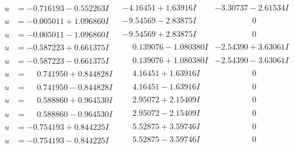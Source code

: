 \documentclass[1p]{elsarticle_modified}
\theoremstyle{definition}
\begin{document}
$$\begin{array}{c|c|c}
\begin{aligned}
u &= -0.716193 - 0.552263 I\end{aligned}
 & -4.16451 + 1.63916 I & -3.30737 - 2.61534 I \\ \hline\begin{aligned}
u &= -0.005011 + 1.096860 I\end{aligned}
 & -9.54569 - 2.83875 I & \phantom{-0.000000 } 0 \\ \hline\begin{aligned}
u &= -0.005011 - 1.096860 I\end{aligned}
 & -9.54569 + 2.83875 I & \phantom{-0.000000 } 0 \\ \hline\begin{aligned}
u &= -0.587223 + 0.661375 I\end{aligned}
 & \phantom{-}0.139076 - 1.080380 I & -2.54390 + 3.63061 I \\ \hline\begin{aligned}
u &= -0.587223 - 0.661375 I\end{aligned}
 & \phantom{-}0.139076 + 1.080380 I & -2.54390 - 3.63061 I \\ \hline\begin{aligned}
u &= \phantom{-}0.741950 + 0.844828 I\end{aligned}
 & \phantom{-}4.16451 + 1.63916 I & \phantom{-0.000000 } 0 \\ \hline\begin{aligned}
u &= \phantom{-}0.741950 - 0.844828 I\end{aligned}
 & \phantom{-}4.16451 - 1.63916 I & \phantom{-0.000000 } 0 \\ \hline\begin{aligned}
u &= \phantom{-}0.588860 + 0.964530 I\end{aligned}
 & \phantom{-}2.95072 + 2.15409 I & \phantom{-0.000000 } 0 \\ \hline\begin{aligned}
u &= \phantom{-}0.588860 - 0.964530 I\end{aligned}
 & \phantom{-}2.95072 - 2.15409 I & \phantom{-0.000000 } 0 \\ \hline\begin{aligned}
u &= -0.754193 + 0.844225 I\end{aligned}
 & \phantom{-}5.52875 + 3.59746 I & \phantom{-0.000000 } 0 \\ \hline\begin{aligned}
u &= -0.754193 - 0.844225 I\end{aligned}
 & \phantom{-}5.52875 - 3.59746 I & \phantom{-0.000000 } 0 \\ \hline\begin{aligned}

\end{aligned}
\end{array}$$
\end{document}
